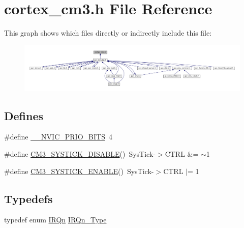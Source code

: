 \hypertarget{a00468}{
\section{cortex\_\-cm3.h File Reference}
\label{a00468}
}
This graph shows which files directly or indirectly include this file:
\nopagebreak
\begin{figure}[H]
\begin{center}
\leavevmode
\includegraphics[width=400pt]{a00693}
\end{center}
\end{figure}
\subsection*{Defines}
\begin{DoxyCompactItemize}
\item 
\#define \hyperlink{a00468_ae3fe3587d5100c787e02102ce3944460}{\_\-\_\-NVIC\_\-PRIO\_\-BITS}~4
\item 
\#define \hyperlink{a00468_ad029062794cf5513d5810b4d14f24e22}{CM3\_\-SYSTICK\_\-DISABLE}()~SysTick-\/$>$CTRL \&= $\sim$1
\item 
\#define \hyperlink{a00468_acbdf9ae987029704b1971825ca1cc8a3}{CM3\_\-SYSTICK\_\-ENABLE}()~SysTick-\/$>$CTRL $|$= 1
\end{DoxyCompactItemize}
\subsection*{Typedefs}
\begin{DoxyCompactItemize}
\item 
typedef enum \hyperlink{a00468_a666eb0caeb12ec0e281415592ae89083}{IRQn} \hyperlink{a00468_ac3af4a32370fb28c4ade8bf2add80251}{IRQn\_\-Type}
\end{DoxyCompactItemize}
